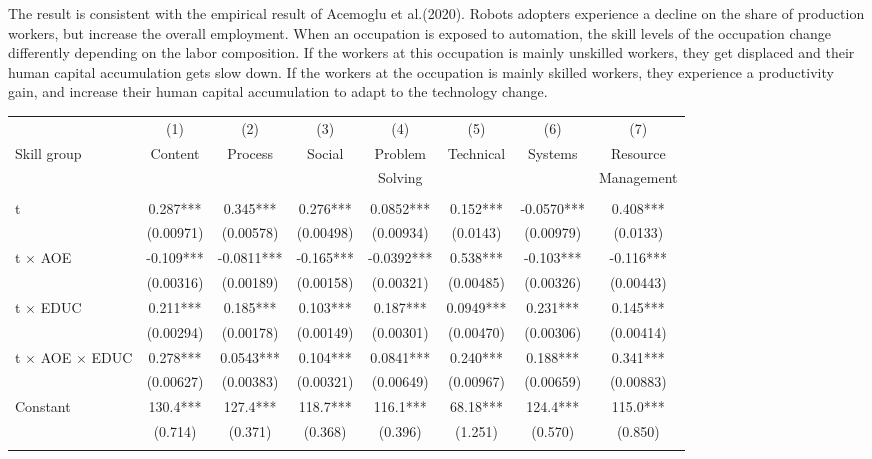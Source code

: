 \documentclass[12pt]{article}
\begin{document}
The result is consistent with the empirical result of Acemoglu et al.(2020)\nocite{Acemogluetal2020}. Robots adopters experience a decline on the share of production workers, but increase the overall employment. When an occupation is exposed to automation, the skill levels of the occupation change differently depending on the labor composition. If the workers at this occupation is mainly unskilled workers, they get displaced and their human capital accumulation gets slow down. If the workers at the occupation is mainly skilled workers, they experience a productivity gain, and increase their human capital accumulation to adapt to the technology change. 
\begin{table}[h!]
\begin{center}
\scriptsize
\begin{tabular}{lccccccc} \hline \hline
 & (1) & (2) & (3) & (4) & (5) & (6) & (7) \\
Skill group & Content & Process & Social & Problem& Technical & Systems & Resource\\ 
 & &  & & Solving &  & & Management \\ \hline
 &  &  &  &  &  &  &  \\
t & 0.287*** & 0.345*** & 0.276*** & 0.0852*** & 0.152*** & -0.0570*** & 0.408*** \\
 & (0.00971) & (0.00578) & (0.00498) & (0.00934) & (0.0143) & (0.00979) & (0.0133) \\
t $\times$ AOE& -0.109*** & -0.0811*** & -0.165*** & -0.0392*** & 0.538*** & -0.103*** & -0.116*** \\
 & (0.00316) & (0.00189) & (0.00158) & (0.00321) & (0.00485) & (0.00326) & (0.00443) \\
t $\times$ EDUC & 0.211*** & 0.185*** & 0.103*** & 0.187*** & 0.0949*** & 0.231*** & 0.145*** \\
 & (0.00294) & (0.00178) & (0.00149) & (0.00301) & (0.00470) & (0.00306) & (0.00414) \\
t $\times$ AOE $\times$ EDUC & 0.278*** & 0.0543*** & 0.104*** & 0.0841*** & 0.240*** & 0.188*** & 0.341*** \\
 & (0.00627) & (0.00383) & (0.00321) & (0.00649) & (0.00967) & (0.00659) & (0.00883) \\
Constant & 130.4*** & 127.4*** & 118.7*** & 116.1*** & 68.18*** & 124.4*** & 115.0*** \\
 & (0.714) & (0.371) & (0.368) & (0.396) & (1.251) & (0.570) & (0.850) \\
 &  &  &  &  &  &  &  \\

\end{tabular}
\end{center}
\end{table}
\end{document}
